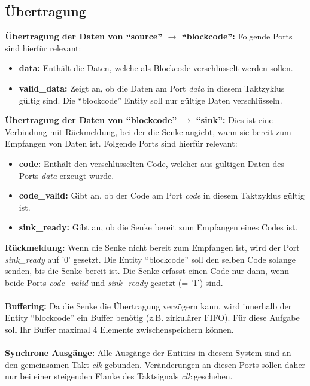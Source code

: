 \documentclass[a4paper,12pt]{article}
\begin{document}
\newpage
\subsection*{\noindent \"Ubertragung}

\textbf{\"Ubertragung der Daten von "`source"' $\rightarrow$ "`blockcode"':} Folgende Ports sind hierf\"ur relevant:
\begin{itemize}
\item \textbf{data:} Enth\"alt die Daten, welche als Blockcode verschl\"usselt werden sollen.
\item \textbf{valid\_data:} Zeigt an, ob die Daten am Port \textit{data} in diesem Taktzyklus g\"ultig sind. Die "`blockcode"' Entity soll nur g\"ultige Daten verschl\"usseln.
\end{itemize}

\textbf{\"Ubertragung der Daten von "`blockcode"' $\rightarrow$ "`sink"':} Dies ist eine Verbindung mit R\"uckmeldung, bei der die Senke angiebt, wann sie bereit zum Empfangen von Daten ist. Folgende Ports sind hierf\"ur relevant:
\begin{itemize}
\item \textbf{code:} Enth\"alt den verschl\"usselten Code, welcher aus g\"ultigen Daten des Ports \textit{data} erzeugt wurde.
\item \textbf{code\_valid:} Gibt an, ob der Code am Port \textit{code}  in diesem Taktzyklus g\"ultig ist.
\item \textbf{sink\_ready:} Gibt an, ob die Senke bereit zum Empfangen eines Codes ist.
\end{itemize}

\textbf{R\"uckmeldung:} Wenn die Senke nicht bereit zum Empfangen ist, wird der Port \textit{sink\_ready} auf '0' gesetzt. Die Entity "`blockcode"' soll den selben Code solange senden, bis die Senke bereit ist. Die Senke erfasst einen Code nur dann, wenn beide Ports \textit{code\_valid} und \textit{sink\_ready} gesetzt (= '1') sind.\\
\\
\textbf{Buffering:} Da die Senke die \"Ubertragung verz\"ogern kann, wird innerhalb der Entity "`blockcode"' ein Buffer ben\"otig (z.B. zirkul\"arer FIFO). F\"ur diese Aufgabe soll Ihr Buffer maximal 4 Elemente zwischenspeichern k\"onnen. \\
\\
\textbf{Synchrone Ausg\"ange:} Alle Ausg\"ange der Entities in diesem System sind an den gemeinsamen Takt \textit{clk} gebunden. Ver\"anderungen an diesen Ports sollen daher nur bei einer steigenden Flanke des Taktsignals \textit{clk} geschehen.\\
\end{document}
